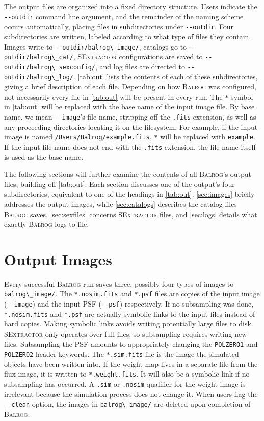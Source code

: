 \documentclass[11pt]{book}
\newcommand{\codett}[1]{\lstinline{#1}}
\newcommand{\balrog}{\textsc{Balrog}}
\newcommand{\sex}{\textsc{SExtractor}}
\newcommand{\opt}[1]{\codett{--#1}}
\begin{document}
The output files are organized into a fixed directory structure.
Users indicate the \opt{outdir} command line argument, and
the remainder of the naming scheme occurs automatically,
placing files in subdirectories under \opt{outdir}.
Four subdirectories are written, labeled according to what
type of files they contain. 
Images write to \opt{outdir}\codett{/balrog\_image/}, 
catalogs go to \opt{outdir}\codett{/balrog\_cat/},
\sex{} configurations are saved to \opt{outdir}\codett{/balrog\_sexconfig/},
and log files are directed to \opt{outdir}\codett{/balrog\_log/}.
\autoref{tab:out} lists the contents of each of these subdirectories,
giving a brief description of each file. Depending on how
\balrog{} was configured, not necessarily every file
in \autoref{tab:out} will be present in every run.
The \codett{*} symbol in \autoref{tab:out} will be replaced with
the base name of the input image file.
By base name, we mean \opt{image}'s file name, stripping off the \codett{.fits} extension,
as well as any proceeding directories locating it on the filesystem.
For example,
if the input image is named \codett{/Users/Balrog/example.fits},
\codett{*} will be replaced with \codett{example}.
If the input file name does not end with the \codett{.fits}
extension, the file name itself is used as the base name.

The following sections will further examine the contents of 
all \balrog{}'s output files, building off \autoref{tab:out}.
Each section discusses one of the output's four subdirectories,
equivalent to one of the headings in \autoref{tab:out}.
\autoref{sec:images} briefly addresses the output images,
while \autoref{sec:catalogs} describes the catalog files \balrog{} saves.
\autoref{sec:sexfiles} concerns \sex{} files, and
\autoref{sec:logs} details what exactly \balrog{} logs to file.

\section{Output Images}
\label{sec:images}

Every successful \balrog{} run saves three, possibly four types of images to \codett{balrog\_image/}.
The \codett{*.nosim.fits} and \codett{*.psf} files are copies of the 
input image (\opt{image}) and the input PSF (\opt{psf}) respectively.
If no subsampling was done, \codett{*.nosim.fits} and \codett{*.psf} are actually symbolic links to the input files instead of hard copies. 
Making symbolic links avoids writing potentially large files to disk. %
\sex{} only operates over full files, so subsampling requires writing new files.
Subsampling the PSF amounts to appropriately changing the 
\codett{POLZERO1} and \codett{POLZERO2} header keywords.
The \codett{*.sim.fits} file is the image the simulated objects have been written into.
If the weight map lives in a separate file from the flux image, it is written to \codett{*.weight.fits}. 
It will also be a symbolic link if no subsampling has occurred.
A \codett{.sim} or \codett{.nosim} qualifier for the weight image is irrelevant because the simulation process does not change it.
When users flag the \opt{clean} option, the images in \codett{balrog\_image/} are deleted upon completion of \balrog{}.
\end{document}
